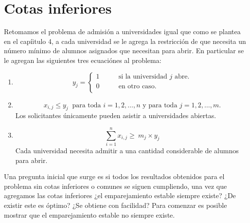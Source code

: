 \chapter{Cotas inferiores}

Retomamos el problema de admisión a universidades igual que como se plantea en el capíitulo 4, a cada universidad se le agrega la restricción de que necesita un número mínimo de alumnos asignados que necesitan para abrir. En particular se le agregan las siguientes tres ecuaciónes al problema:

\begin{enumerate}
\item \begin{equation} y_{j}= 
\begin{cases}
1 & \qquad \text{si la universidad $j$ abre.} \\
0 &\qquad\text{en otro caso.} \\ 
\end{cases} \end{equation} 
\item \begin{equation} \label{r6}
x_{i,j} \leq y_j \ \text{ para toda $i=1,2,\ldots,n$ y para toda $j=1,2,\ldots,m$.}
\end{equation}
Los solicitantes únicamente pueden asistir a universidades abiertas.
\item \begin{equation} \label{r4}
\sum_{i=1}^{n} x_{i,j} \geq\ m_j\times y_j 
\end{equation}
Cada universidad necesita admitir a una cantidad considerable de alumnos para abrir.
\end{enumerate}

Una pregunta inicial que surge es si todos los resultados obtenidos para el problema sin cotas inferiores o comunes se siguen cumpliendo, una vez que agregamos las cotas inferiores ¿el emparejamiento estable siempre existe? ¿De existir este es óptimo? ¿Se obtiene con facilidad? Para comenzar es posible mostrar que el emparejamiento estable no siempre existe.

